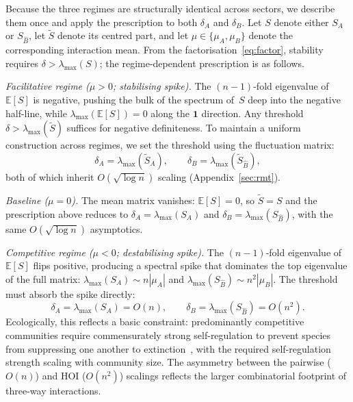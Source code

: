 \documentclass[pdflatex,sn-mathphys-num]{sn-jnl}%
\newcommand{\bone}{\mathbf{1}}
\begin{document}
Because the three regimes are structurally identical across sectors, we describe them once and apply the prescription to both $\delta_A$ and $\delta_B$. Let $S$ denote either $S_A$ or $S_{\hat{B}}$, let $\tilde{S}$ denote its centred part, and let $\mu \in \{\mu_A, \mu_B\}$ denote the corresponding interaction mean. From the factorisation~\eqref{eq:factor}, stability requires $\delta > \lambda_{\max}(S)$; the regime-dependent prescription is as follows.

\emph{Facilitative regime ($\mu > 0$; stabilising spike).} The $(n{-}1)$-fold eigenvalue of $\mathbb{E}[S]$ is negative, pushing the bulk of the spectrum of~$S$ deep into the negative half-line, while $\lambda_{\max}(\mathbb{E}[S]) = 0$ along the $\bone$ direction. Any threshold $\delta > \lambda_{\max}(\tilde{S})$ suffices for negative definiteness. To maintain a uniform construction across regimes, we set the threshold using the fluctuation matrix:
\[
\delta_A = \lambda_{\max}(\tilde{S}_A), \qquad \delta_B = \lambda_{\max}(\tilde{S}_{\hat{B}}),
\]
both of which inherit $O(\sqrt{\log n})$ scaling (Appendix~\ref{sec:rmt}).

\emph{Baseline ($\mu = 0$).} The mean matrix vanishes: $\mathbb{E}[S] = 0$, so $\tilde{S} = S$ and the prescription above reduces to $\delta_A = \lambda_{\max}(S_A)$ and $\delta_B = \lambda_{\max}(S_{\hat{B}})$, with the same $O(\sqrt{\log n})$ asymptotics.

\emph{Competitive regime ($\mu < 0$; destabilising spike).} The $(n{-}1)$-fold eigenvalue of $\mathbb{E}[S]$ flips positive, producing a spectral spike that dominates the top eigenvalue of the full matrix: $\lambda_{\max}(S_A) \sim n|\mu_A|$ and $\lambda_{\max}(S_{\hat{B}}) \sim n^2|\mu_B|$. The threshold must absorb the spike directly:
\[
\delta_A = \lambda_{\max}(S_A) = O(n), \qquad \delta_B = \lambda_{\max}(S_{\hat{B}}) = O(n^2).
\]
Ecologically, this reflects a basic constraint: predominantly competitive communities require commensurately strong self-regulation to prevent species from suppressing one another to extinction~\cite{stone_feasibility_2018, lechon-alonso_robust_2026}, with the required self-regulation strength scaling with community size. The asymmetry between the pairwise ($O(n)$) and HOI ($O(n^2)$) scalings reflects the larger combinatorial footprint of three-way interactions.
\end{document}

